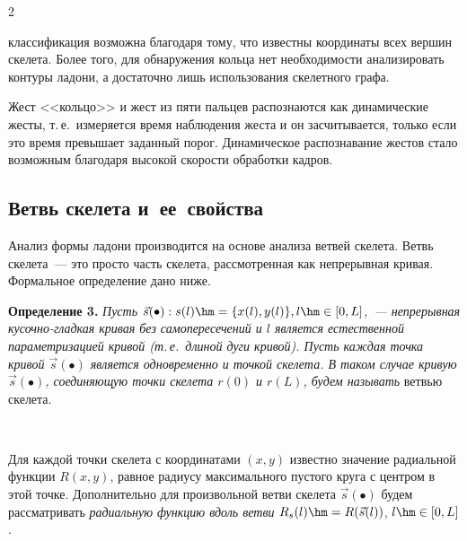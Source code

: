 \begin{multicols}{2}
\smallskip
\addtocounter{figure}{1}


\noindent
 классификация возможна благодаря тому, что известны координаты всех вершин скелета.
Более того, для обнаружения кольца нет необходимости анализировать контуры ладони, а 
достаточно лишь использования скелетного графа.

Жест <<кольцо>> и жест из пяти пальцев распознаются как динамические жесты,
т.\,е.\ измеряется время наблюдения жеста и он засчитывается, только если 
это время превышает заданный порог.
Динамическое распознавание жестов стало возможным благодаря высокой 
скорости обработки кадров.

\subsection{Ветвь скелета и~ее~свойства}\label{seq:GestureRecognition_SkeletonBranch}

Анализ формы ладони производится на основе анализа ветвей скелета.
Ветвь скелета~--- это прос\-то часть скелета, рассмотренная как непрерывная кривая.
Формальное определение дано ниже.

\medskip

\noindent
\textbf{Определение 3.} %
\textit{Пусть $\vec s(\bullet): s(l) \hm= \{ x(l), y(l) \}, l \hm\in [0, L]$,~--- 
непрерывная ку\-соч\-но-глад\-кая кривая без самопересечений и $l$ является 
естественной па\-ра\-мет\-ри\-за\-ци\-ей кривой (т.\,е.\ длиной дуги кривой).
Пусть каждая точка кривой $\vec s(\bullet)$ является одновременно и точкой скелета.
В таком случае кривую $\vec s(\bullet)$, 
соединяющую точки скелета $r(0)$ и $r(L)$, будем называть} ветвью скелета.

\begin{figure}[b] %
\vspace*{-6pt}
 \begin{center}
 \mbox{%
 \epsfxsize=162.248mm
 }
 \end{center}
 \vspace*{-12pt}
\end{figure}

Для каждой точки скелета с координатами $(x,y)$ известно значение радиальной 
функции $R(x,y)$, равное радиусу максимального пустого круга с центром в этой точке.
Дополнительно для произвольной ветви скелета $\vec s(\bullet)$ будем рассматривать 
\textit{радиальную функцию вдоль ветви} $R_{s}(l) \hm= R(\vec s(l))$, $l \hm\in [0, L]$.


\end{multicols}
